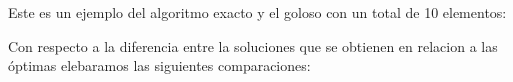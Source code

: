 Este es un ejemplo del algoritmo exacto y el goloso con un total de 10 elementos:

\begin{figure} [!ht]
 \centering
       \label{fig:fam5exacto}
    \label{fig:fam5goloso}
    \end{figure}
    
Con respecto a la diferencia entre la soluciones que se obtienen en relacion a las óptimas elebaramos las siguientes comparaciones:\\\\
 

  \begin{figure} [h]
 \centering
    \end{figure} 
 
